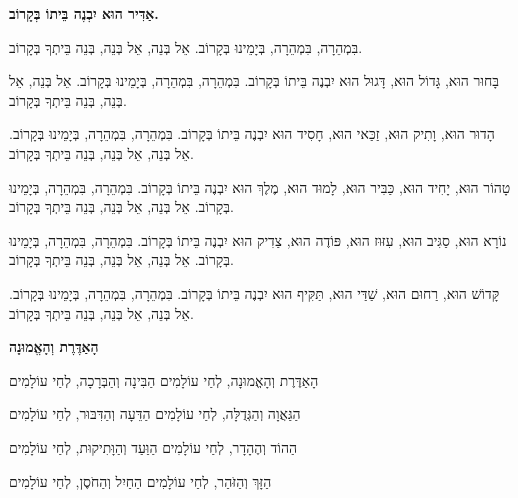 \begin{center}
{\large \bfseries
אַדִּיר הוּא יִבְנֶה בֵּיתוֹ בְּקָרוֹב.
}
\end{center}

בִּמְהֵרָה, בִּמְהֵרָה, בְּיָמֵינוּ בְּקָרוֹב. אֵל בְּנֵה, אֵל בְּנֵה, בְּנֵה בֵּיתְךָ בְּקָרוֹב.

\vspace{1em}

בָּחוּר הוּא, גָּדוֹל הוּא, דָּגוּל הוּא יִבְנֶה בֵּיתוֹ בְּקָרוֹב. בִּמְהֵרָה, בִּמְהֵרָה, בְּיָמֵינוּ בְּקָרוֹב. אֵל בְּנֵה, אֵל בְּנֵה, בְּנֵה בֵּיתְךָ בְּקָרוֹב.

\vspace{1em}

הָדוּר הוּא, וָתִיק הוּא, זַכַּאי הוּא, חָסִיד הוּא יִבְנֶה בֵּיתוֹ בְּקָרוֹב. בִּמְהֵרָה, בִּמְהֵרָה, בְּיָמֵינוּ בְּקָרוֹב. אֵל בְּנֵה, אֵל בְּנֵה, בְּנֵה בֵּיתְךָ בְּקָרוֹב.

\vspace{1em}

טָהוֹר הוּא, יָחִיד הוּא, כַּבִּיר הוּא, לָמוּד הוּא, מֶלֶךְ הוּא יִבְנֶה בֵּיתוֹ בְּקָרוֹב. בִּמְהֵרָה, בִּמְהֵרָה, בְּיָמֵינוּ בְּקָרוֹב. אֵל בְּנֵה, אֵל בְּנֵה, בְּנֵה בֵּיתְךָ בְּקָרוֹב.

\vspace{1em}

נוֹרָא הוּא, סַגִּיב הוּא, עִזּוּז הוּא, פּוֹדֶה הוּא, צַדִיק הוּא יִבְנֶה בֵּיתוֹ בְּקָרוֹב. בִּמְהֵרָה, בִּמְהֵרָה, בְּיָמֵינוּ בְּקָרוֹב. אֵל בְּנֵה, אֵל בְּנֵה, בְּנֵה בֵּיתְךָ בְּקָרוֹב.

\vspace{1em}

קָּדוֹשׁ הוּא, רַחוּם הוּא, שַׁדַּי הוּא, תַּקִּיף הוּא יִבְנֶה בֵּיתוֹ בְּקָרוֹב. בִּמְהֵרָה, בִּמְהֵרָה, בְּיָמֵינוּ בְּקָרוֹב. אֵל בְּנֵה, אֵל בְּנֵה, בְּנֵה בֵּיתְךָ בְּקָרוֹב.


\begin{center}
{\large \bfseries
הָאַדֶּרֶת וְהָאֱמוּנָה
}
\end{center}

הָאַדֶּרֶת וְהָאֱמוּנָה, לְחַי עוֹלָמִים
\hfill
הַבִּינָה וְהַבְּרָכָה, לְחַי עוֹלָמִים

הַגַּאֲוָה וְהַגְּדֻלָּה, לְחַי עוֹלָמִים
\hfill
הַדֵּעָה וְהַדִּבּוּר, לְחַי עוֹלָמִים

הַהוֹד וְהֶהָדָר, לְחַי עוֹלָמִים
\hfill
הַוַּעַד וְהַוָּתִיקוּת, לְחַי עוֹלָמִים

הַזָּךְ וְהַזֹּהַר, לְחַי עוֹלָמִים
\hfill
הַחַיִל וְהַחֹסֶן, לְחַי עוֹלָמִים

